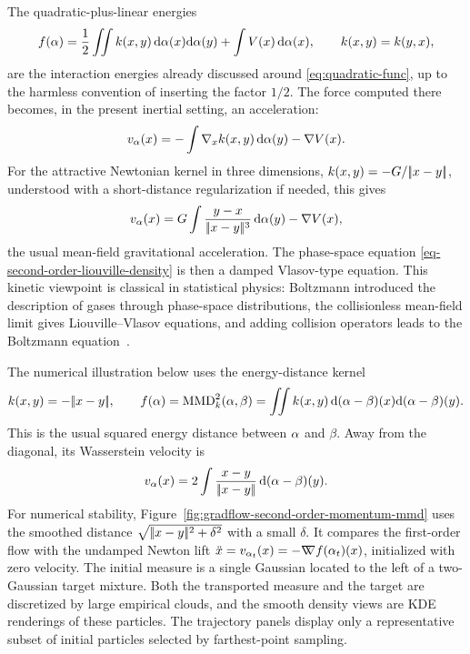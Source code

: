 \begin{example}\label{ex-quadratic-momentum-gravity}
	The quadratic-plus-linear energies
	\[
		f(\alpha)=\frac12\iint k(x,y)\,\mathrm{d}\alpha(x)\mathrm{d}\alpha(y)+\int V(x)\,\mathrm{d}\alpha(x),
		\qquad k(x,y)=k(y,x),
	\]
	are the interaction energies already discussed around \eqref{eq:quadratic-func}, up to the harmless convention of inserting the factor $1/2$. The force computed there becomes, in the present inertial setting, an acceleration:
	\[
		v_\alpha(x)
		=
		-\int \nabla_x k(x,y)\,\mathrm{d}\alpha(y)-\nabla V(x).
	\]
	For the attractive Newtonian kernel in three dimensions, $k(x,y)=-G/|\!| x-y |\!|$, understood with a short-distance regularization if needed, this gives
	\[
		v_\alpha(x)
		=
		G\int \frac{y-x}{|\!| x-y |\!|^3}\,\mathrm{d}\alpha(y)-\nabla V(x),
	\]
	the usual mean-field gravitational acceleration. The phase-space equation \eqref{eq-second-order-liouville-density} is then a damped Vlasov-type equation. This kinetic viewpoint is classical in statistical physics: Boltzmann introduced the description of gases through phase-space distributions, the collisionless mean-field limit gives Liouville--Vlasov equations, and adding collision operators leads to the Boltzmann equation~\cite{CercignaniIllnerPulvirenti1994DiluteGases,Villani2002Boltzmann,BraunHepp1977Vlasov}.
\end{example}

The numerical illustration below uses the energy-distance kernel
\[
	k(x,y)=-|\!| x-y |\!|,
	\qquad
	f(\alpha)=\operatorname{MMD}_k^2(\alpha,\beta)
	=
	\iint k(x,y)\,\mathrm{d}(\alpha-\beta)(x)\mathrm{d}(\alpha-\beta)(y).
\]
This is the usual squared energy distance between $\alpha$ and $\beta$. Away from the diagonal, its Wasserstein velocity is
\[
	v_\alpha(x)
	=
	2\int \frac{x-y}{|\!| x-y |\!|}\,\mathrm{d}(\alpha-\beta)(y).
\]
For numerical stability, Figure~\ref{fig:gradflow-second-order-momentum-mmd} uses the smoothed distance $\sqrt{|\!| x-y |\!|^2+\delta^2}$ with a small $\delta$. It compares the first-order flow with the undamped Newton lift $\ddot x=v_{\alpha_t}(x)=-\mathord{\nabla\mkern-9.3mu\nabla} f(\alpha_t)(x)$, initialized with zero velocity. The initial measure is a single Gaussian located to the left of a two-Gaussian target mixture. Both the transported measure and the target are discretized by large empirical clouds, and the smooth density views are KDE renderings of these particles. The trajectory panels display only a representative subset of initial particles selected by farthest-point sampling.

